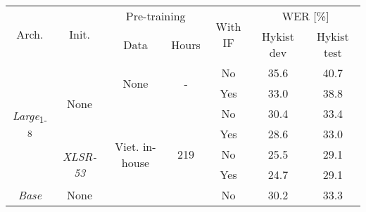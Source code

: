 

\begin{table}[!ht]
\captionsetup{font=Large}
\centering
\begin{adjustbox}{width=0.7\columnwidth,center}
\begin{tabular}{|c|c|c|c|c|c|c|} 
\hline
\multirow{2}{*}{Arch.}             & \multirow{2}{*}{Init.}             & \multicolumn{2}{c|}{Pre-training}                            & \multirow{2}{*}{With IF} & \multicolumn{2}{c|}{WER [\%]}  \\ 
\cline{3-4}\cline{6-7}
                                   &                                    & Data                                 & Hours                 &                          & Hykist dev & Hykist test       \\ 
\hline
\multirow{6}{*}{\textit{Large}\textsubscript{1-8}} & \multirow{4}{*}{None}              & \multirow{2}{*}{None}                & \multirow{2}{*}{-}    & No                       & 35.6       & 40.7              \\ 
\cline{5-7}
                                   &                                    &                                      &                       & Yes                      & 33.0       & 38.8              \\ 
\cline{3-7}
                                   &                                    & \multirow{6}{*}{Viet. in-house}      & \multirow{6}{*}{219}  & No                       & 30.4       & 33.4              \\ 
\cline{5-7}
                                   &                                    &                                      &                       & Yes                      & 28.6       & 33.0              \\ 
\cline{2-2}\cline{5-7}
                                   & \multirow{2}{*}{\textit{XLSR-53 }} &                                      &                       & No                       & 25.5       & 29.1              \\ 
\cline{5-7}
                                   &                                    &                                      &                       & Yes                      & 24.7       & 29.1              \\ 
\cline{1-2}\cline{5-7}
\multirow{2}{*}{\textit{Base}}     & \multirow{6}{*}{None}              &                                      &                       & No                       & 30.2       & 33.3              \\ 

\end{tabular}
\end{adjustbox}
\end{table}
